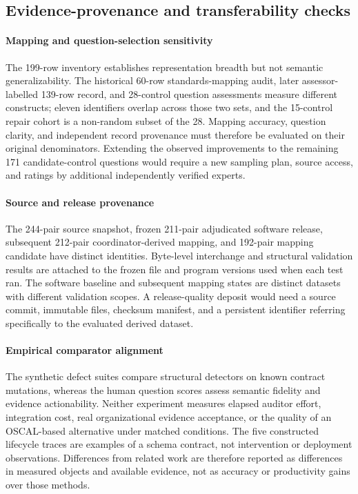 \documentclass[12pt,a4paper]{article}
\begin{document}
\subsection{Evidence-provenance and transferability checks}
\label{sec:provenance-constraints}
\paragraph{Mapping and question-selection sensitivity} The 199-row inventory establishes representation breadth but not semantic generalizability. The historical 60-row standards-mapping audit, later assessor-labelled 139-row record, and 28-control question assessments measure different constructs; eleven identifiers overlap across those two sets, and the 15-control repair cohort is a non-random subset of the 28. Mapping accuracy, question clarity, and independent record provenance must therefore be evaluated on their original denominators. Extending the observed improvements to the remaining 171 candidate-control questions would require a new sampling plan, source access, and ratings by additional independently verified experts.

\paragraph{Source and release provenance} The 244-pair source snapshot, frozen 211-pair adjudicated software release, subsequent 212-pair coordinator-derived mapping, and 192-pair mapping candidate have distinct identities. Byte-level interchange and structural validation results are attached to the frozen file and program versions used when each test ran. The software baseline and subsequent mapping states are distinct datasets with different validation scopes. A release-quality deposit would need a source commit, immutable files, checksum manifest, and a persistent identifier referring specifically to the evaluated derived dataset.

\paragraph{Empirical comparator alignment} The synthetic defect suites compare structural detectors on known contract mutations, whereas the human question scores assess semantic fidelity and evidence actionability. Neither experiment measures elapsed auditor effort, integration cost, real organizational evidence acceptance, or the quality of an OSCAL-based alternative under matched conditions. The five constructed lifecycle traces are examples of a schema contract, not intervention or deployment observations. Differences from related work are therefore reported as differences in measured objects and available evidence, not as accuracy or productivity gains over those methods.
\end{document}
